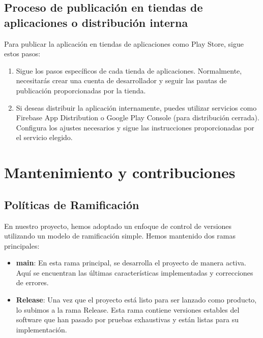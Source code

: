 \documentclass{article}
\begin{document}
    \subsection{Proceso de publicación en tiendas de aplicaciones o distribución interna}
    
    Para publicar la aplicación en tiendas de aplicaciones como Play Store, sigue estos pasos:
    
    \begin{enumerate}
        \item Sigue los pasos específicos de cada tienda de aplicaciones. Normalmente, necesitarás crear una cuenta de desarrollador y seguir las pautas de publicación proporcionadas por la tienda.
        
        \item Si deseas distribuir la aplicación internamente, puedes utilizar servicios como Firebase App Distribution o Google Play Console (para distribución cerrada). Configura los ajustes necesarios y sigue las instrucciones proporcionadas por el servicio elegido.
    \end{enumerate}

\section{Mantenimiento y contribuciones}

    \subsection{Políticas de Ramificación}
    
    En nuestro proyecto, hemos adoptado un enfoque de control de versiones utilizando un modelo de ramificación simple. Hemos mantenido dos ramas principales:
    
    \begin{itemize}
        \item \textbf{main}: En esta rama principal, se desarrolla el proyecto de manera activa. Aquí se encuentran las últimas características implementadas y correcciones de errores.
        
        \item \textbf{Release}: Una vez que el proyecto está listo para ser lanzado como producto, lo subimos a la rama Release. Esta rama contiene versiones estables del software que han pasado por pruebas exhaustivas y están listas para su implementación.
    \end{itemize}
    
\end{document}
